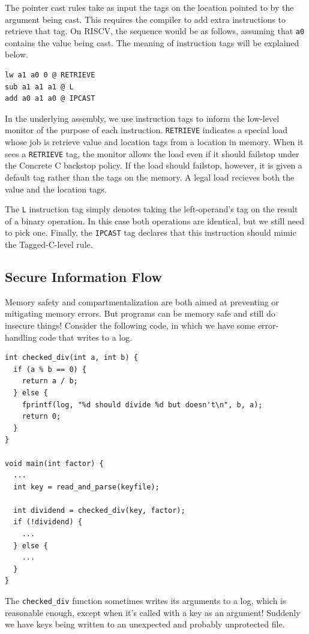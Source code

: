 \documentclass[acmsmall,review,anonymous]{acmart}\settopmatter{printfolios=true,printccs=false,printacmref=false}
\begin{document}
The pointer cast rules take as input the tags on the location pointed to by the
argument being cast. This requires the compiler to add extra instructions to retrieve that tag.
On RISCV, the sequence would be as follows, assuming that {\tt a0} contains the
value being cast. The meaning of instruction tags will be explained below.

\begin{verbatim}
lw a1 a0 0 @ RETRIEVE
sub a1 a1 a1 @ L
add a0 a1 a0 @ IPCAST
\end{verbatim}

In the underlying assembly, we use instruction tags to inform the low-level monitor
of the purpose of each instruction. {\tt RETRIEVE} indicates a special load
whose job is retrieve value and location tags from a location in memory. When it sees
a {\tt RETRIEVE} tag, the monitor allows the load even if it should failstop under the
Concrete C backstop policy. If the load should failstop, however, it is given a default
tag rather than the tags on the memory. A legal load recieves both the value and the location
tags.

The {\tt L} instruction tag simply denotes taking the left-operand's tag on the result of a
binary operation. In this case both operations are identical, but we still need to pick one.
Finally, the {\tt IPCAST} tag declares that this instruction should mimic the Tagged-C-level
rule.

\subsection{Secure Information Flow}
\label{sec:SIF}

Memory safety and compartmentalization are both aimed at preventing or mitigating
memory errors. But programs can be memory safe and still do insecure things! Consider the
following code, in which we have some error-handling code that writes to a log.

\begin{verbatim}
int checked_div(int a, int b) {
  if (a % b == 0) {
    return a / b;
  } else {
    fprintf(log, "%d should divide %d but doesn't\n", b, a);
    return 0;
  }
}

void main(int factor) {
  ...
  int key = read_and_parse(keyfile);
  
  int dividend = checked_div(key, factor);
  if (!dividend) {
    ...
  } else {
    ...
  }
}
\end{verbatim}

The {\tt checked\_div} function sometimes writes its arguments to a log,
which is reasonable enough, except when it's called with a key as an argument!
Suddenly we have keys being written to an unexpected and probably unprotected file.
\end{document}
